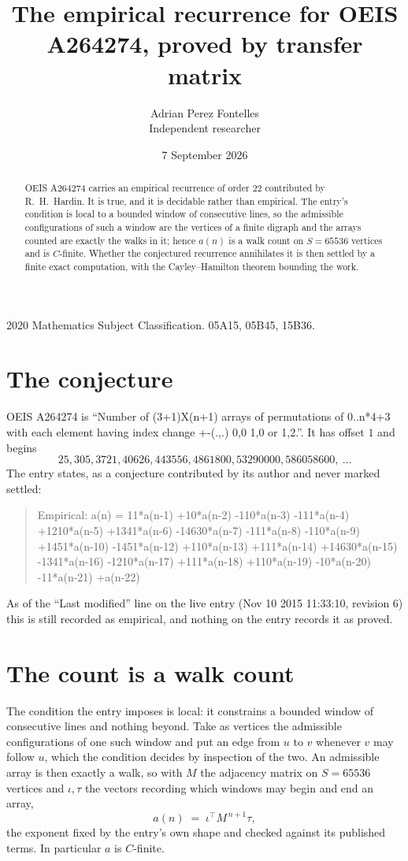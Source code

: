 \documentclass[11pt,a4paper]{article}
\title{The empirical recurrence for OEIS A264274, proved by transfer matrix}
\author{Adrian Perez Fontelles\\ \small Independent researcher}
\date{7 September 2026}
\theoremstyle{plain}
\theoremstyle{definition}
\begin{document}
\maketitle

\begin{abstract}
OEIS A264274 carries an empirical recurrence of order $22$ contributed by R.~H.~Hardin. It is
true, and it is decidable rather than empirical. The entry's condition is local to a bounded window of consecutive lines, so
the admissible configurations of such a window are the vertices of a finite digraph and the
arrays counted are exactly the walks in it; hence $a(n)$ is a walk count on $S=65536$ vertices
and is $C$-finite. Whether the conjectured recurrence annihilates it is then settled by a
finite exact computation, with the Cayley--Hamilton theorem bounding the work.
\end{abstract}

\noindent\small 2020 Mathematics Subject Classification. 05A15, 05B45, 15B36.\normalsize

\section{The conjecture}

OEIS A264274 is ``Number of (3+1)X(n+1) arrays of permutations of 0..n*4+3 with each element having index change +-(.,.) 0,0 1,0 or 1,2.''. It has offset $1$ and begins
\[
25, 305, 3721, 40626, 443556, 4861800, 53290000, 586058600,\ \dots
\]
The entry states, as a conjecture contributed by its author and never marked settled:
\begin{quote}
Empirical: a(n) = 11*a(n-1) +10*a(n-2) -110*a(n-3) -111*a(n-4) +1210*a(n-5) +1341*a(n-6) -14630*a(n-7) -111*a(n-8) -110*a(n-9) +1451*a(n-10) -1451*a(n-12) +110*a(n-13) +111*a(n-14) +14630*a(n-15) -1341*a(n-16) -1210*a(n-17) +111*a(n-18) +110*a(n-19) -10*a(n-20) -11*a(n-21) +a(n-22)
\end{quote}
As of the ``Last modified'' line on the live entry (Nov 10 2015 11:33:10, revision 6) this is still
recorded as empirical, and nothing on the entry records it as proved.

\section{The count is a walk count}

The condition the entry imposes is local: it constrains a bounded window of consecutive lines and nothing beyond. Take as
vertices the admissible configurations of one such window and put an edge from $u$ to $v$
whenever $v$ may follow $u$, which the condition decides by inspection of the two. An
admissible array is then exactly a walk, so with $M$ the adjacency matrix on $S=65536$ vertices
and $\iota,\tau$ the vectors recording which windows may begin and end an array,
\[
a(n)\;=\;\iota^{\!\top}M^{\,n+1}\tau ,
\]
the exponent fixed by the entry's own shape and checked against its published terms. In
particular $a$ is $C$-finite.
\end{document}
